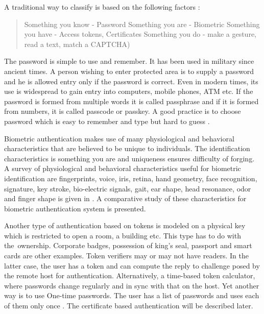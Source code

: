 \begin{multicols}{2}
A traditional way to classify is based on the following factors \cite{chap2-key2}:
\begin{quote}
Something you know - Password
Something you are - Biometric
Something you have - Access tokens, Certificates
Something you do - make a gesture, read a text, match a CAPTCHA)
\end{quote}

The password is simple to use and remember. It has been used in military since ancient times. A person wishing to enter protected area is to supply a password and he is allowed entry only if the password is correct. Even in modern times, its use is widespread to gain entry into computers, mobile phones, ATM etc. If the password is formed from multiple words it is called passphrase and if it is formed from numbers, it is called passcode or passkey. A good practice is to choose password which is easy to remember and type but hard to guess \cite{chap2-key2}.

Biometric authentication makes use of many physiological and behavioral characteristics that are believed to be unique to individuals. The identification characteristics is something you are and uniqueness ensures difficulty of forging. A survey of physiological and behavioral characteristics useful for biometric identification are fingerprints, voice, iris, retina, hand geometry, face recognition, signature, key stroke, bio-electric signals, gait, ear shape, head resonance, odor and finger shape is given in \cite{chap2-key3}. A comparative study of these characteristics for biometric authentication system is presented. 

Another type of authentication based on tokens is modeled on a physical key which is restricted to open a room, a building etc. This type has to do with the ownership. Corporate badges, possession of king's seal, passport and smart cards are other examples. Token verifiers may or may not have readers. In the latter case, the user has a token and can compute the reply to challenge posed by the remote host for authentication. Alternatively, a time-based token calculator, where passwords change regularly and in sync with that on the host. Yet another way is to use One-time passwords. The user has a list of passwords and uses each of them only once \cite{chap2-key2}. The certificate based authentication will be described later.


\end{multicols}
